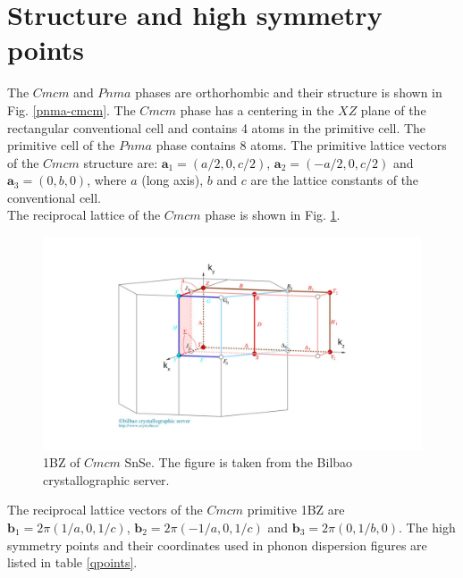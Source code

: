 \section{Structure and high symmetry points}

The $Cmcm$ and $Pnma$ phases are orthorhombic and their structure  is shown in Fig. \ref{pnma-cmcm}. The $Cmcm$ phase 
has a centering in the $XZ$ plane of the rectangular conventional cell and contains 4 atoms in the primitive cell. 
The primitive cell of the $Pnma$ phase contains $8$ atoms. The primitive lattice vectors 
of the $Cmcm$ structure are: $\mathbf{a}_{1}=(a/2,0,c/2)$, $\mathbf{a}_{2}=(-a/2,0,c/2)$ and
$\mathbf{a}_{3}=(0,b,0)$, where $a$ (long axis), $b$ and $c$ are the lattice constants of the conventional cell. \\

The reciprocal lattice of the $Cmcm$ phase is shown in Fig. \ref{1bzsnse}.
\begin{figure}[h]
\begin{center}
\includegraphics[width=\linewidth]{Figures/brillouinsnse.pdf}
	\caption[1BZ of $Cmcm$ SnSe]{1BZ of $Cmcm$ SnSe. The figure is taken from the Bilbao crystallographic server.}
\label{1bzsnse}
\end{center}
\end{figure}
The reciprocal lattice vectors of the $Cmcm$ primitive 1BZ are $\mathbf{b}_{1}=2\pi(1/a,0,1/c)$, 
$\mathbf{b}_{2}=2\pi(-1/a,0,1/c)$ and $\mathbf{b}_{3}=2\pi(0,1/b,0)$. The high symmetry points and their coordinates 
used in phonon dispersion figures are listed in table \ref{qpoints}.
